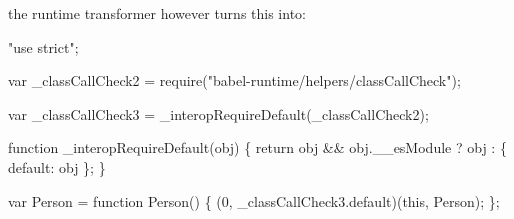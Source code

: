 the {\ttfamily runtime} transformer however turns this into\+:


\begin{DoxyCode}
"use strict";

var \_classCallCheck2 = require("babel-runtime/helpers/classCallCheck");

var \_classCallCheck3 = \_interopRequireDefault(\_classCallCheck2);

function \_interopRequireDefault(obj) \{ return obj && obj.\_\_esModule ? obj : \{ default: obj \}; \}

var Person = function Person() \{
  (0, \_classCallCheck3.default)(this, Person);
\};
\end{DoxyCode}
 